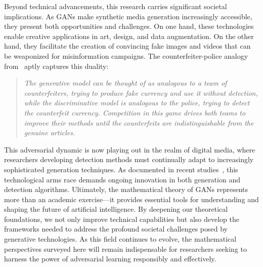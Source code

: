 Beyond technical advancements, this research carries significant societal implications. As GANs make synthetic media generation increasingly accessible, they present both opportunities and challenges. On one hand, these technologies enable creative applications in art, design, and data augmentation. On the other hand, they facilitate the creation of convincing fake images and videos that can be weaponized for misinformation campaigns. The counterfeiter-police analogy from~\cite{ref:goodfellow-original} aptly captures this duality:
\begin{quote}
	\itshape The generative model can be thought of as analogous to a team of counterfeiters, trying to produce fake currency and use it without detection, while the discriminative model is analogous to the police, trying to detect the counterfeit currency. Competition in this game drives both teams to improve their methods until the counterfeits are indistinguishable from the genuine articles.
\end{quote}
This adversarial dynamic is now playing out in the realm of digital media, where researchers developing detection methods must continually adapt to increasingly sophisticated generation techniques. As documented in recent studies~\cite{ref:df1,ref:df2,ref:df3,ref:df4,ref:df5,ref:df6,ref:df7,ref:df8,ref:df9,ref:df10,ref:df11,ref:df12}, this technological arms race demands ongoing innovation in both generation and detection algorithms.
Ultimately, the mathematical theory of GANs represents more than an academic exercise—it provides essential tools for understanding and shaping the future of artificial intelligence. By deepening our theoretical foundations, we not only improve technical capabilities but also develop the frameworks needed to address the profound societal challenges posed by generative technologies. As this field continues to evolve, the mathematical perspectives surveyed here will remain indispensable for researchers seeking to harness the power of adversarial learning responsibly and effectively.
